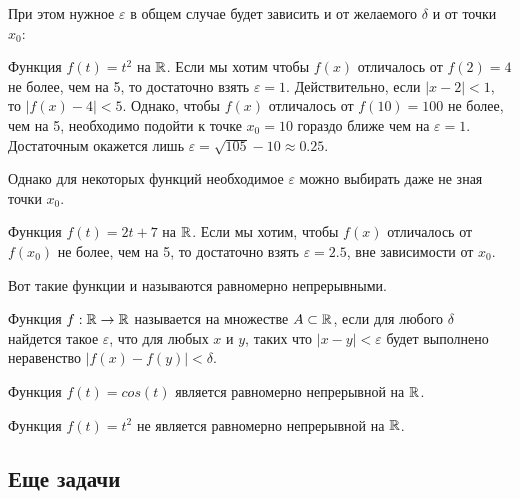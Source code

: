 {При этом нужное $\varepsilon$ в общем случае будет зависить и от желаемого $\delta$ и от точки $x_{0}$:

\begin{myex}
Функция $f(t)=t^{2}$ на $\mathbb R$. Если мы хотим чтобы $f(x)$ отличалось от $f(2)=4$ не более, чем на 5, то достаточно взять $\varepsilon=1$. Действительно, если $|x-2|<1$, то $|f(x)-4|<5$. Однако, чтобы $f(x)$ отличалось от $f(10)=100$ не более, чем на 5, необходимо подойти к точке $x_{0}=10$ гораздо ближе чем на $\varepsilon=1$. Достаточным окажется лишь $\varepsilon=\sqrt{105}-10\approx 0.25$.
\end{myex}

Однако для некоторых функций необходимое $\varepsilon$ можно выбирать даже не зная точки $x_{0}$.

\begin{myex}
Функция $f(t)=2t+7$ на $\mathbb R$. Если мы хотим, чтобы $f(x)$ отличалось от $f(x_{0})$ не более, чем на 5, то достаточно взять $\varepsilon=2.5$, вне зависимости от $x_{0}$.
\end{myex}

Вот такие функции и называются равномерно непрерывными.
\begin{mydef}
Функция $f:\mathbb R\rightarrow\mathbb R$ называется  на множестве $A\subset \mathbb R$, если для любого $\delta$ найдется такое $\varepsilon$, что для любых $x$ и $y$, таких что $|x-y|<\varepsilon$ будет выполнено неравенство $|f(x)-f(y)|<\delta$.
\end{mydef}

\begin{myex}
Функция $f(t)=cos(t)$ является равномерно непрерывной на $\mathbb R$.
\end{myex}

\begin{myex}
Функция $f(t)=t^{2}$ не является равномерно непрерывной на $\mathbb R$.
\end{myex}




}\subsection{Еще задачи}



\solution{}


